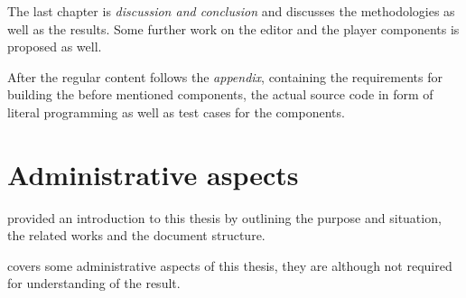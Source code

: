 \documentclass[%
    a4paper,
    nobib,   %
    openany  %
]{tufte-book}
\begin{document}

The last chapter is \textit{discussion and conclusion} and discusses the
methodologies as well as the results. Some further work on the editor and the
player components is proposed as well.

After the regular content follows the \textit{appendix}, containing the
requirements for building the before mentioned components, the actual source
code in form of literal programming as well as test cases for the components.

\chapter{Administrative aspects}
\label{chap:administrative_aspects}

 provided an introduction to this thesis by
outlining the purpose and situation, the related works and the document
structure.

 covers some administrative aspects of this thesis,
they are although not required for understanding of the result.
\end{document}
